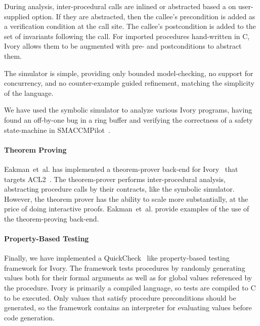 During analysis, inter-procedural calls are inlined or abstracted based a on
user-supplied option. If they are abstracted, then the callee's precondition is
added as a verification condition at the call site. The callee's postcondition
is added to the set of invariants following the call. For imported procedures
hand-written in C, Ivory allows them to be augmented with pre- and
postconditions to abstract them.

The simulator is simple, providing only bounded model-checking, no support for
concurrency, and no counter-example guided refinement, matching the simplicity
of the language.

We have used the symbolic simulator to analyze various Ivory programs, having
found an off-by-one bug in a ring buffer and verifying the correctness of a
safety state-machine in SMACCMPilot~\cite{smaccm}.

\paragraph{Theorem Proving}

Eakman~et~al. has implemented a theorem-prover back-end for
Ivory~\cite{ivory-acl2} that targets ACL2~\cite{acl}. The theorem-prover
performs inter-procedural analysis, abstracting procedure calls by their
contracts, like the symbolic simulator. However, the theorem prover has the
ability to scale more substantially, at the price of doing interactive
proofs. Eakman~et~al. provide examples of the use of the theorem-proving
back-end.

\paragraph{Property-Based Testing}

Finally, we have implemented a QuickCheck~\cite{qc} like property-based testing
framework for Ivory. The framework tests procedures by randomly generating
values both for their formal arguments as well as for global values referenced
by the procedure. Ivory is primarily a compiled language, so tests are compiled
to C to be executed. Only values that satisfy procedure preconditions should be
generated, so the framework contains an interpreter for evaluating values before
code generation.


